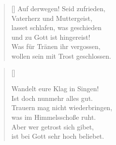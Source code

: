 \begin{multicols}{2}
\begin{verse}[\versewidth]
 Auf derwegen! Seid zufrieden,\\
Vaterherz und Muttergeist,\\
lasset schlafen, was geschieden\\
und zu Gott ist hingereist!\\
Was für Tränen ihr vergossen,\\
wollen sein mit Trost geschlossen.
\end{verse}
\end{multicols}

\begin{center}
\settowidth{\versewidth}{Der, vor dem die Welt erschrickt,}
\begin{verse}[\versewidth]


 Wandelt eure Klag in Singen!\\
Ist doch nunmehr alles gut.\\
Trauern mag nicht wiederbringen,\\
was im Himmelsschoße ruht.\\
Aber wer getrost sich gibet,\\
ist bei Gott sehr hoch beliebet.
\end{verse}
\end{center}
  
